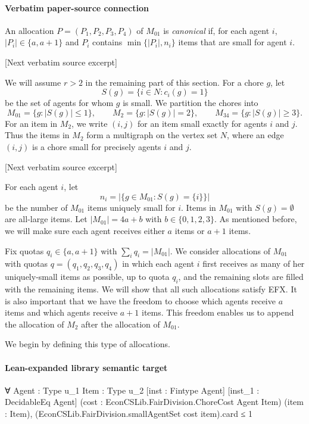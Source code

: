 \documentclass[10pt]{article}
\begin{document}
\paragraph{Verbatim paper-source connection}
\begin{ReviewVerbatim}
An allocation $P=(P_1,P_2,P_3,P_4)$ of $M_{01}$ is \emph{canonical} if, for each agent $i$, $|P_i|\in\{a,a+1\}$ and $P_i$ contains $\min\{|P_i|, n_i\}$ items that are small for agent $i$.

[Next verbatim source excerpt]

We will assume $r>2$ in the remaining part of this section.
For a chore $g$, let
\[
 S(g)=\{i\in N:c_i(g)=1\}
\]
be the set of agents for whom $g$ is small.  We partition the chores into
\[
M_{01}=\{g:|S(g)|\le 1\},\qquad
M_2=\{g:|S(g)|=2\},\qquad
M_{34}=\{g:|S(g)|\ge 3\}.
\]
For an item in $M_2$, we write $(i,j)$ for an item small exactly for agents
$i$ and $j$.  Thus the items in $M_2$ form a multigraph on the vertex set
$N$, where an edge $(i,j)$ is a chore small for precisely agents $i$ and $j$.

[Next verbatim source excerpt]

For each agent $i$, let
\[
 n_i=\left|\{g\in M_{01}:S(g)=\{i\}\}\right|
\]
be the number of $M_{01}$ items uniquely small for $i$.  Items in $M_{01}$
with $S(g)=\emptyset$ are all-large items.
Let $|M_{01}|=4a+b$ with $b\in\{0,1,2,3\}$.
As mentioned before, we will make sure each agent receives either $a$ items or $a+1$ items.

Fix quotas $q_i\in\{a,a+1\}$ with $\sum_i q_i=|M_{01}|$.
We consider allocations of $M_{01}$ with quotas $q=(q_1,q_2,q_3,q_4)$ in which each agent $i$ first receives as many of her uniquely-small items as possible, up to quota $q_i$, and the remaining slots are filled with the remaining items.
We will show that all such allocations satisfy EFX.
It is also important that we have the freedom to choose which agents receive $a$ items and which agents receive $a+1$ items.
This freedom enables us to append the allocation of $M_2$ after the allocation of $M_{01}$.

We begin by defining this type of allocations.
\end{ReviewVerbatim}

\paragraph{Lean-expanded library semantic target}
\begin{ReviewVerbatim}
∀ {Agent : Type u_1} {Item : Type u_2} [inst : Fintype Agent] [inst_1 : DecidableEq Agent]
  (cost : EconCSLib.FairDivision.ChoreCost Agent Item) (item : Item),
  (EconCSLib.FairDivision.smallAgentSet cost item).card ≤ 1
\end{ReviewVerbatim}
\end{document}

